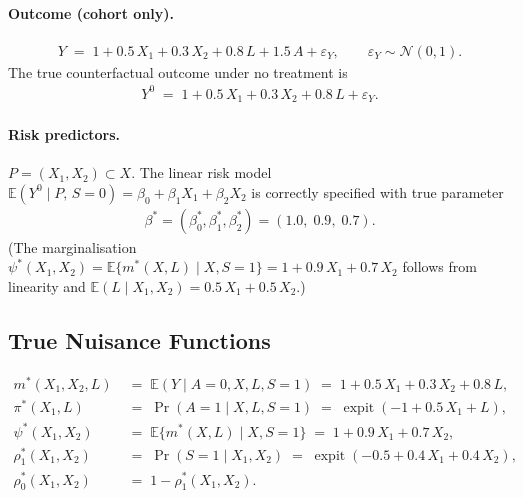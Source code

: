 \paragraph{Outcome (cohort only).}
\begin{align}
  Y \;=\; 1 + 0.5\,X_1 + 0.3\,X_2 + 0.8\,L + 1.5\,A + \varepsilon_Y,
  \qquad \varepsilon_Y \sim \mathcal{N}(0,1).
\end{align}
The true counterfactual outcome under no treatment is
\begin{align}
  Y^0 \;=\; 1 + 0.5\,X_1 + 0.3\,X_2 + 0.8\,L + \varepsilon_Y.
\end{align}

\paragraph{Risk predictors.}
$P = (X_1, X_2) \subset X$. The linear risk model
$\mathbb{E}(Y^0 \mid P,\, S=0) = \beta_0 + \beta_1 X_1 + \beta_2 X_2$
is correctly specified with true parameter
\begin{align}
  \beta^* = (\beta_0^*, \beta_1^*, \beta_2^*) = (1.0,\; 0.9,\; 0.7).
\end{align}
(The marginalisation $\psi^*(X_1,X_2) = \mathbb{E}\{m^*(X,L)\mid X,S=1\}
= 1 + 0.9\,X_1 + 0.7\,X_2$ follows from linearity and
$\mathbb{E}(L \mid X_1, X_2) = 0.5\,X_1 + 0.5\,X_2$.)

\subsection*{True Nuisance Functions}

\begin{align}
  m^*(X_1, X_2, L)
    &\;=\; \mathbb{E}(Y \mid A=0, X, L, S=1)
     \;=\; 1 + 0.5\,X_1 + 0.3\,X_2 + 0.8\,L, \\[4pt]
  \pi^*(X_1, L)
    &\;=\; \Pr(A=1 \mid X, L, S=1)
     \;=\; \operatorname{expit}(-1 + 0.5\,X_1 + L), \\[4pt]
  \psi^*(X_1, X_2)
    &\;=\; \mathbb{E}\{m^*(X,L) \mid X, S=1\}
     \;=\; 1 + 0.9\,X_1 + 0.7\,X_2, \\[4pt]
  \rho_1^*(X_1, X_2)
    &\;=\; \Pr(S=1 \mid X_1, X_2)
     \;=\; \operatorname{expit}(-0.5 + 0.4\,X_1 + 0.4\,X_2), \\[4pt]
  \rho_0^*(X_1, X_2)
    &\;=\; 1 - \rho_1^*(X_1, X_2).
\end{align}

